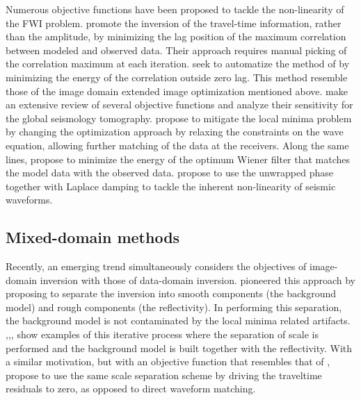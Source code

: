 Numerous objective functions have been proposed to tackle the non-linearity of the
FWI problem.
 \cite{Luo91} promote the inversion of the travel-time information, rather
than the amplitude, by minimizing the lag position of the maximum correlation between
modeled and observed data. Their approach requires manual picking of the correlation maximum
at each iteration. \cite{van2010correlation} seek to automatize the method of \cite{Luo91} 
by minimizing the energy of the correlation outside zero lag. This method resemble those 
of the image domain extended image optimization mentioned above.
\cite{GJI:GJI4970} make
an extensive review of several objective functions and analyze their sensitivity 
for the global seismology tomography. 
\cite{van2013mitigating} propose to mitigate the local
minima problem by changing the optimization
approach by relaxing the constraints on the wave equation, allowing further matching of the data
at the receivers. Along the same lines, 
\cite{simon,warner} propose to minimize the energy of the optimum Wiener filter that
matches the model data with the observed data. 
 \cite{ChoiTariq} propose to use the unwrapped phase together with 
Laplace damping to tackle the inherent non-linearity of seismic waveforms. 


\subsection{Mixed-domain methods}

Recently, an emerging trend simultaneously considers the objectives
of image-domain inversion  with those of data-domain inversion. \cite{clement} 
 pioneered  this approach by proposing to separate the inversion into smooth 
components (the background model) and rough components (the reflectivity). In performing
this separation, the background model is not contaminated by the local minima related artifacts. 
 \cite{Xu},\cite{HWang},\cite{Zhou01092015},\cite{Zedong} show examples of this iterative process where 
the separation of scale is performed and the background model is built together with the
reflectivity. With a similar motivation, but with an objective function that resembles that of \cite{Luo91},
 \cite{MaWarping} propose to use the same scale separation scheme by driving 
the traveltime residuals to zero, as opposed to direct waveform matching. 
 
